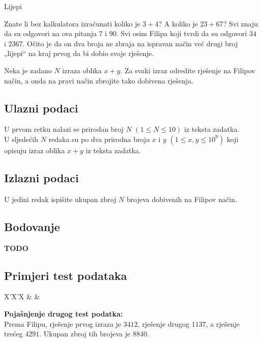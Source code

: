 \begin{statement}[
  problempoints=30,
  timelimit=1 sekunda,
  memorylimit=512 MiB,
]{Lijepi}

Znate li bez kalkulatora izračunati koliko je $3+4$? A koliko je $23+67$? Svi
znaju da su odgovori na ova pitanja $7$ i $90$. Svi osim Filipa koji tvrdi da
su odgovori $34$ i $2367$. Očito je da on dva broja ne zbraja na ispravan način
već drugi broj „lijepi“ na kraj prvog da bi dobio svoje rješenje.

Neka je zadano $N$ izraza oblika $x+y$. Za svaki izraz odredite rješenje na
Filipov način, a onda na pravi način zbrojite tako dobivena rješenja.

\subsection*{Ulazni podaci}
U prvom retku nalazi se prirodan broj $N$ $(1 \le N \le 10)$ iz teksta zadatka. \\
U sljedećih $N$ redaka su po dva prirodna broja $x$ i $y$ $(1 \le x, y \le 10^9)$
koji opisuju izraz oblika $x+y$ iz teksta zadatka.

\subsection*{Izlazni podaci}
U jedini redak ispišite ukupan zbroj $N$ brojeva dobivenih na Filipov način.

\subsection*{Bodovanje}
\textbf{TODO}

\subsection*{Primjeri test podataka}
\begin{tabularx}{\textwidth}{X'X'X}
 &
 &
\end{tabularx}

\textbf{Pojašnjenje drugog test podatka:} \\
Prema Filipu, rješenje prvog izraza je $3412$, rješenje drugog $1137$, a
rješenje trećeg $4291$. Ukupan zbroj tih brojeva je $8840$.

\end{statement}

